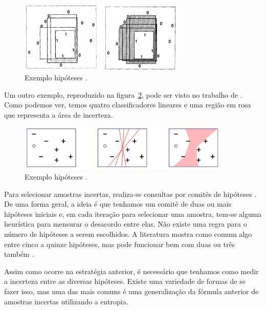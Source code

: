\begin{figure}
  \centering
  \includegraphics[width=0.7\textwidth]{figures/cohn_1994_hypothesis_space_example.png}
  \caption{Exemplo  hipóteses \citep{cohn1994improving}.}
  \label{fig:cohn_1994_hypothesis_space_example}
\end{figure}

Um outro exemplo, reproduzido na figura~\ref{fig:dasgupta_two_faces_hypothesis_example}, pode ser visto no trabalho de \citep{dasgupta2011two}. Como podemos ver, temos quatro classificadores lineares e uma região em rosa que representa a área de incerteza. 

\begin{figure}
  \centering
  \includegraphics[width=0.9\textwidth]{figures/dasgupta_two_faces_hypothesis_example.png}
  \caption{Exemplo  hipóteses \citep{dasgupta2011two}.}
  \label{fig:dasgupta_two_faces_hypothesis_example}
\end{figure}


Para selecionar amostras incertas, realiza-se consultas por comitês de hipóteses \citep{seung1992query}. De uma forma geral, a ideia é que tenhamos um comitê de duas ou mais hipóteses iniciais e, em cada iteração para selecionar uma amostra, tem-se alguma heurística para mensurar o desacordo entre elas. Não existe uma regra para o número de hipóteses a serem escolhidos. A literatura mostra como comum algo entre cinco a quinze hipóteses, mas pode funcionar bem com duas ou três também \citep{settles2014active}. 


Assim como ocorre na estratégia anterior, é necessário que tenhamos como medir a incerteza entre as diversas hipóteses. Existe uma variedade de formas de se fazer isso, mas uma das mais comuns é uma generalização da fórmula anterior de amostras incertas utilizando a entropia.

